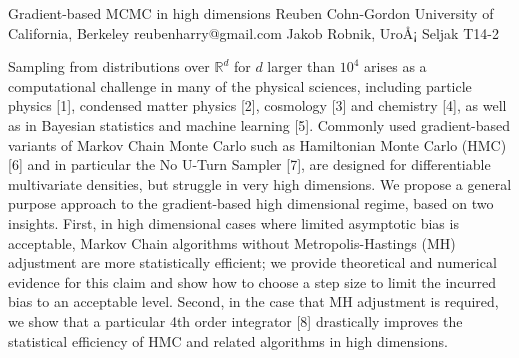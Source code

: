 \begin{talk}
  {Gradient-based MCMC in high dimensions}%
  {Reuben Cohn-Gordon}%
  {University of California, Berkeley}%
  {reubenharry@gmail.com}%
  {Jakob Robnik, UroÅ¡ Seljak}%
  {T14-2}%
			
Sampling from distributions over $\mathbb{R}^d$ for $d$ larger than $10^4$ arises as a computational challenge in many of the physical sciences, including particle physics [1], condensed matter physics [2], cosmology [3] and chemistry [4], as well as in Bayesian statistics and machine learning [5]. Commonly used gradient-based variants of Markov Chain Monte Carlo such as Hamiltonian Monte Carlo (HMC) [6] and in particular the No U-Turn Sampler [7], are designed for differentiable multivariate densities, but struggle in very high dimensions. 
We propose a general purpose approach to the gradient-based high dimensional regime, based on two insights. First, in high dimensional cases where limited asymptotic bias is acceptable, Markov Chain algorithms without Metropolis-Hastings (MH) adjustment are more statistically efficient; we provide theoretical and numerical evidence for this claim and show how to choose a step size to limit the incurred bias to an acceptable level. Second, in the case that MH adjustment is required, we show that a particular 4th order integrator [8] drastically improves the statistical efficiency of HMC and related algorithms in high dimensions.


\medskip


\end{talk}

